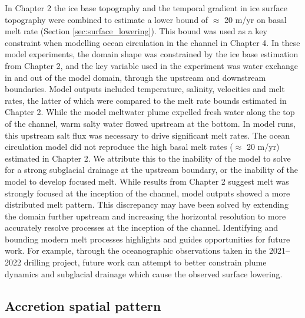 In Chapter 2 the ice base topography and the temporal gradient in ice surface topography were combined to estimate a lower bound of $\approx$ 20 m/yr on basal melt rate (Section \ref{sec:surface_lowering}). This bound was used as a key constraint when modelling ocean circulation in the channel in Chapter 4. 
In these model experiments, the domain shape was constrained by the ice base estimation from Chapter 2, and the key variable used in the experiment was water exchange in and out of the model domain, through the upstream and downstream boundaries. Model outputs included temperature, salinity, velocities and melt rates, the latter of which  were compared to the melt rate bounds estimated in Chapter 2. 
While the model meltwater plume expelled fresh water along the top of the channel, warm salty water flowed upstream at the bottom. In model runs, this upstream salt flux was necessary to drive significant melt rates.
The ocean circulation model did not reproduce the high basal melt rates ($\approx$ 20 m/yr) estimated in Chapter 2. We attribute this to the inability of the model to solve for a strong subglacial drainage at the upstream boundary, or the inability of the model to develop focused melt. While results from Chapter 2 suggest melt was strongly focused at the inception of the channel, model outputs showed a more distributed melt pattern. This discrepancy may have been solved by extending the domain further upstream and increasing the horizontal resolution to more accurately resolve processes at the inception of the channel. 
Identifying and bounding modern melt processes highlights and guides opportunities for future work. For example, through the oceanographic observations taken in the 2021--2022 drilling project, future work can attempt to better constrain plume dynamics and subglacial drainage which cause the observed surface lowering.  

\subsection{Accretion spatial pattern}

